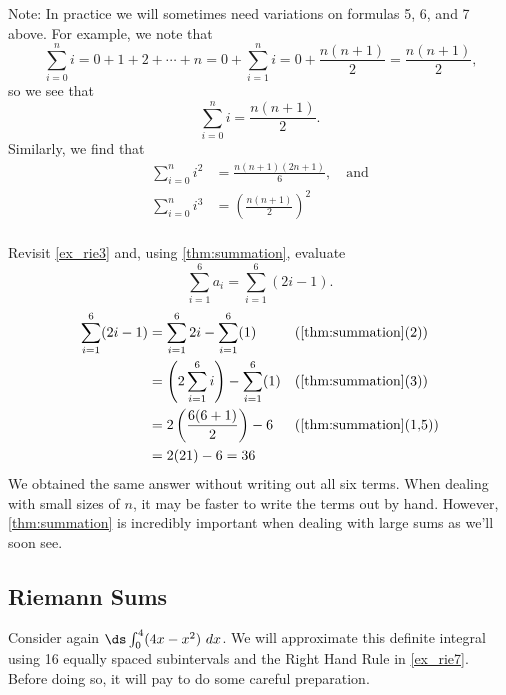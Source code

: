 Note: In practice we will sometimes need variations on formulas 5, 6, and 7 above. For example, we note that
\[
\sum_{i=0}^n i=0+1+2+\cdots+n
=0+\sum_{i=1}^n i=0+\frac{n(n+1)}{2}
=\frac{n(n+1)}{2}\text{,}
\]
so we see that \[\sum_{i=0}^n i=\frac{n(n+1)}{2}.\] Similarly, we find that 
\begin{align*}
\sum_{i=0}^n i^2&=\frac{n(n+1)(2n+1)}{6},\quad\text{and}\\
\sum_{i=0}^n i^3&=\left(\frac{n(n+1)}{2}\right)^2\\
\end{align*}

{Revisit \autoref{ex_rie3} and, using \autoref{thm:summation}, evaluate $$\sum_{i=1}^6 a_i = \sum_{i=1}^6 (2i-1).$$
}
{\begin{align*}
\sum_{i=1}^6 (2i-1)
&=\sum_{i=1}^6 2i-\sum_{i=1}^6 (1) && \text{(\autoref{thm:summation}(2))}\\
&=\left( 2\sum_{i=1}^6 i\right) -\sum_{i=1}^6 (1)
&& \text{(\autoref{thm:summation}(3))}\\
&=2\left(\frac{6(6+1)}{2}\right)-6 && \text{(\autoref{thm:summation}(1,5))}\\
&=2(21)-6=36
\end{align*}
We obtained the same answer without writing out all six terms. When dealing with small sizes of $n$, it may be faster to write the terms out by hand. However, \autoref{thm:summation} is incredibly important when dealing with large sums as we'll soon see.}
 
\subsection*{Riemann Sums}

Consider again $\ds\int_0^4(4x-x^2)\ dx$. We will approximate this definite integral using 16 equally spaced subintervals and the Right Hand Rule in \autoref{ex_rie7}. Before doing so, it will pay to do some careful preparation.


